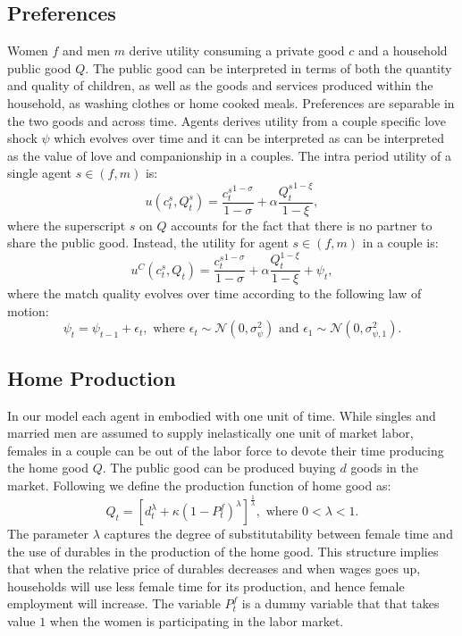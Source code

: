 \documentclass[12pt]{article}
\numberwithin{table}{section}
\begin{document}
\subsection{Preferences}
Women $f$ and men $m$ derive utility consuming a private good  $c$ and a household public good $Q$. The public good can be interpreted in terms of both the quantity and quality of children, as well as the goods and services produced within the household, as washing clothes  or home cooked meals. Preferences are separable in the two goods and across time.
Agents derives utility from a couple specific love shock $\psi$ which evolves over time and it can be interpreted as  can be interpreted as the value of love and companionship in a couples. The intra period utility of a single agent $s\in(f,m)$ is:
\[u(c^s_t,Q^s_t)=\frac{{c^s_t}^{1-\sigma}}{1-\sigma}+\alpha\frac{{Q^s_t}^{1-\xi}}{1-\xi},\]
where the superscript $s$ on $Q$ accounts for the fact that there is no partner to share the public good. Instead, the utility for  agent $s\in(f,m)$ in a couple is:
\[u^{C}(c^s_t,Q_t)=\frac{{c_t^s}^{1-\sigma}}{1-\sigma}+\alpha\frac{Q_t^{1-\xi}}{1-\xi}+\psi_t,\]
where the match quality evolves over time according to the following law of motion:
\[\psi_t=\psi_{t-1}+\epsilon_t,\text{ where }\epsilon_t \sim\mathcal{N}(0,\sigma^2_{\psi})\text{ and }\epsilon_1\sim\mathcal{N}(0,\sigma_{\psi,1}^{2}). \]
\subsection{Home Production}
In our model each agent in embodied with one unit of time. While singles and married men are assumed to supply inelastically one unit of market labor, females in a couple can be out of the labor force to devote their time producing the home good $Q$. The public good can be produced buying $d$ goods in the market. Following \cite{greenwood2016} we define the production function of home good as:
\begin{equation}\label{eq:pfunction}
Q_t=[d_t^\lambda+\kappa {(1-P^f_t)}^\lambda]^{\frac{1}{\lambda}}, \text{ where }0<\lambda<1.
\end{equation}
The parameter $\lambda$ captures the degree of  substitutability between female time and the use of durables in the production of the home good. This structure implies that when the relative price of durables decreases and when wages goes up, households will use less female time for its production, and hence female employment will increase. The variable  $P^f_t$ is a dummy variable that that takes value $1$ when the women is participating in the labor market.
\end{document}

